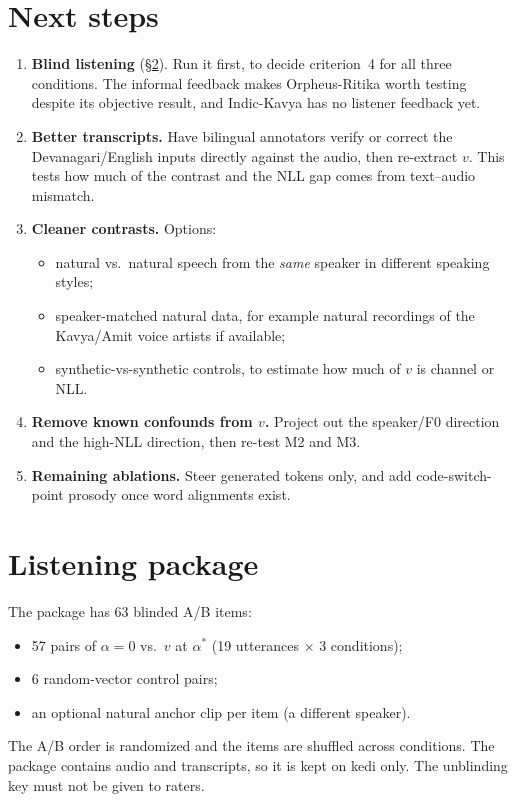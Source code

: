 \documentclass[11pt]{article}
\newcommand{\astar}{\alpha^{*}}
\begin{document}
\section{Next steps}
\begin{enumerate}
\item \textbf{Blind listening} (\S\ref{sec:listening}). Run it first, to decide criterion~4 for all three conditions. The informal feedback makes Orpheus-Ritika worth testing despite its objective result, and Indic-Kavya has no listener feedback yet.
\item \textbf{Better transcripts.} Have bilingual annotators verify or correct the Devanagari/English inputs directly against the audio, then re-extract $v$. This tests how much of the contrast and the NLL gap comes from text--audio mismatch.
\item \textbf{Cleaner contrasts.} Options:
  \begin{itemize}
  \item natural vs.\ natural speech from the \emph{same} speaker in different speaking styles;
  \item speaker-matched natural data, for example natural recordings of the Kavya/Amit voice artists if available;
  \item synthetic-vs-synthetic controls, to estimate how much of $v$ is channel or NLL.
  \end{itemize}
\item \textbf{Remove known confounds from $v$.} Project out the speaker/F0 direction and the high-NLL direction, then re-test M2 and M3.
\item \textbf{Remaining ablations.} Steer generated tokens only, and add code-switch-point prosody once word alignments exist.
\end{enumerate}

\section{Listening package}\label{sec:listening}
The package has 63 blinded A/B items:
\begin{itemize}
\item 57 pairs of $\alpha=0$ vs.\ $v$ at $\astar$ (19 utterances $\times$ 3 conditions);
\item 6 random-vector control pairs;
\item an optional natural anchor clip per item (a different speaker).
\end{itemize}
The A/B order is randomized and the items are shuffled across conditions. The package contains audio and transcripts, so it is kept on kedi only. The unblinding key must not be given to raters.
\end{document}
